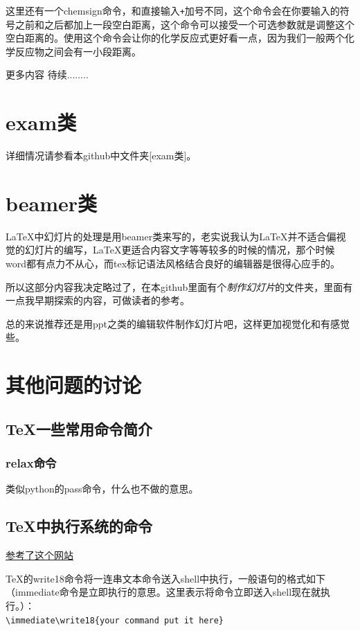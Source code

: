 \documentclass[12pt,oneside]{book}
\begin{document}
\begin{common-format}
这里还有一个chemsign命令，和直接输入\verb|+|加号不同，这个命令会在你要输入的符号之前和之后都加上一段空白距离，这个命令可以接受一个可选参数就是调整这个空白距离的。使用这个命令会让你的化学反应式更好看一点，因为我们一般两个化学反应物之间会有一小段距离。



更多内容 待续........

\chapter{exam类}
详细情况请参看本github中文件夹[exam类]。

\chapter{beamer类}
\LaTeX 中幻灯片的处理是用beamer类来写的，老实说我认为\LaTeX 并不适合偏视觉的幻灯片的编写，\LaTeX 更适合内容文字等等较多的时候的情况，那个时候 word都有点力不从心，而tex标记语法风格结合良好的编辑器是很得心应手的。

所以这部分内容我决定略过了，在本github里面有个\textit{制作幻灯片}的文件夹，里面有一点我早期探索的内容，可做读者的参考。

总的来说推荐还是用ppt之类的编辑软件制作幻灯片吧，这样更加视觉化和有感觉些。



\chapter{其他问题的讨论}
\section{TeX一些常用命令简介}
\subsection{relax命令}
类似python的pass命令，什么也不做的意思。

\section{TeX中执行系统的命令}
\href{http://tex.stackexchange.com/questions/20444/what-are-immediate-write18-and-how-does-one-use-them}{参考了这个网站}

\TeX 的write18命令将一连串文本命令送入shell中执行，一般语句的格式如下（immediate命令是立即执行的意思。这里表示将命令立即送入shell现在就执行。）：\\
\verb+\immediate\write18{your command put it here}+


\end{common-format}
\end{document}
